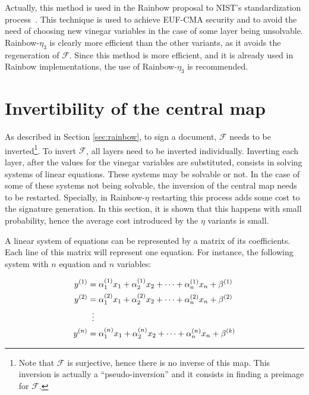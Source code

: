 \documentclass{ufsctex/ufsctex}
\begin{document}
Actually, this method is used in the Rainbow proposal to NIST's standardization
process~\cite{ding2017nist}. This technique is used to achieve
EUF-CMA
security and to avoid the need of choosing new vinegar variables in the case of
some layer being unsolvable. Rainbow-$\eta_3$ is clearly more efficient than
the other variants, as it avoids the regeneration of $\mathcal{F}$. Since this
method is more efficient, and it is already used in Rainbow implementations,
the use of Rainbow-$\eta_3$ is recommended.

\section{Invertibility of the central map}\label{sec:invertibility}

As described in Section \ref{sec:rainbow}, to sign a document, $\mathcal{F}$
needs to be inverted\footnote{Note that $\mathcal{F}$ is surjective, hence
there is no inverse of this map. This inversion is actually a
``pseudo-inversion'' and it consists in finding a preimage for $\mathcal{F}$.}.
To invert $\mathcal{F}$, all layers need to be inverted individually. Inverting
each layer, after the values for the vinegar variables are substituted,
consists in solving systems of linear equations. These systems may be solvable
or not. In the case of some of these systems not being solvable, the inversion
of the central map needs to be restarted. Specially, in Rainbow-$\eta$
restarting this process adds some cost to the signature generation. In this
section, it is shown that this happens with small probability, hence the
average cost introduced by the $\eta$ variants is small.

A linear system of equations can be represented by a matrix of its
coefficients. Each line of this matrix will represent one equation. For
instance, the following system with $n$ equation and $n$ variables:

\begin{equation}
\begin{split}
y^{(1)} &= \alpha^{(1)}_1 x_1 + \alpha^{(1)}_2 x_2 + \cdots +
	\alpha^{(1)}_n x_n + \beta^{(1)} \\
y^{(2)} &= \alpha^{(2)}_1 x_1 + \alpha^{(2)}_2 x_2 + \cdots +
	\alpha^{(2)}_n x_n + \beta^{(2)} \\
&\vdotswithin{=} \\
y^{(n)} &= \alpha^{(n)}_1 x_1 + \alpha^{(n)}_2 x_2 + \cdots +
	\alpha^{(n)}_n x_n + \beta^{(k)} \\
\end{split}
\end{equation}
\end{document}
